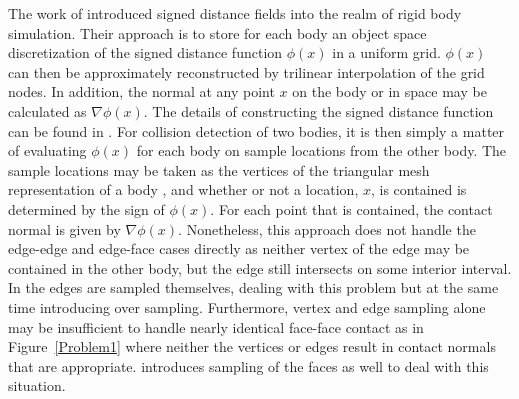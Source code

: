 \documentclass[9pt,twocolumn]{article}
\begin{document}
The work of \cite{Guendelman} introduced signed distance fields into the realm of rigid body simulation. Their approach is to store for each body an object space discretization of the signed distance function $\phi(x)$ in a uniform grid. $\phi(x)$ can then be approximately reconstructed  by trilinear interpolation of the grid nodes. In addition, the normal at any point $x$ on the body or in space may be calculated as $\nabla \phi(x)$. The details of constructing the signed distance function can be found in \cite{Tsitsiklis}\cite{Sethian}. For collision detection of two bodies, it is then simply a matter of evaluating $\phi(x)$ for each body on sample locations from the other body. The sample locations may be taken as the vertices of the triangular mesh representation of a body \cite{Guendelman}, and whether or not a location, $x$,  is contained is determined by the sign of $\phi(x)$. For each point that is contained, the contact normal is given by $\nabla \phi(x)$. Nonetheless, this approach does not handle the edge-edge and edge-face cases directly as neither vertex of the edge may be contained in the other body, but the edge still intersects on some interior interval. In \cite{ErlebenPhd} the edges are sampled themselves, dealing with this problem but at the same time introducing over sampling. Furthermore, vertex and edge sampling alone may be insufficient to handle nearly identical face-face contact as in Figure~\ref{Problem1} where neither the vertices or edges result in contact normals that are appropriate. \cite{ErlebenPhd} introduces sampling of the faces as well to deal with this situation. \newline
\end{document}
